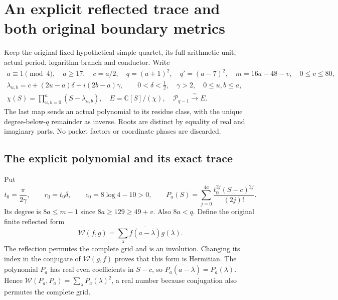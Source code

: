 \begingroup
\section{An explicit reflected trace and both original boundary metrics}
\label{sec:RBV}

Keep the original fixed hypothetical simple quartet, its full arithmetic
unit, actual period, logarithm branch and conductor. Write
\[
\begin{gathered}
a\equiv1\pmod4,\quad a\ge17,\quad c=a/2,\quad
q=(a+1)^2,\quad q'=(a-7)^2,\quad m=16a-48-v,\quad0\le v\le80,\\
\lambda_{u,b}=c+(2u-a)\delta+i(2b-a)\gamma,\qquad
0<\delta<\tfrac12,\quad\gamma>2,\quad0\le u,b\le a,\\
\chi(S)=\prod_{u,b=0}^a(S-\lambda_{u,b}),\quad
E=\mathbb C[S]/(\chi),\quad
\mathcal P_{q-1}\xrightarrow{\ \sim\ }E .
\end{gathered}\tag{RBV1}
\]
The last map sends an actual polynomial to its residue class, with
the unique degree-below-$q$ remainder as inverse. Roots are distinct
by equality of real and imaginary parts. No packet factors or coordinate
phases are discarded.

\subsection{The explicit polynomial and its exact trace}
Put
\[
t_0=\frac\pi{2\gamma},\qquad r_0=t_0\delta,\qquad
c_0=8\log4-10>0,\qquad
P_a(S)=\sum_{j=0}^{4a}\frac{t_0^{2j}(S-c)^{2j}}{(2j)!}.
\tag{RBV2}
\]
Its degree is $8a\le m-1$ since $8a\ge129\ge49+v$.
Also $8a<q$. Define the original finite reflected form
\[
\mathcal W(f,g)=\sum_{\lambda}\overline{f(a-\overline\lambda)}g(\lambda).
\tag{RBV3}
\]
The reflection permutes the complete grid and is an involution.
Changing its index in the conjugate of $\mathcal W(g,f)$ proves
that this form is Hermitian. The polynomial $P_a$ has real even
coefficients in $S-c$, so
$\overline{P_a(a-\overline\lambda)}=P_a(\lambda)$.
Hence $\mathcal W(P_a,P_a)=\sum_\lambda P_a(\lambda)^2$, a real
number because conjugation also permutes the complete grid.

